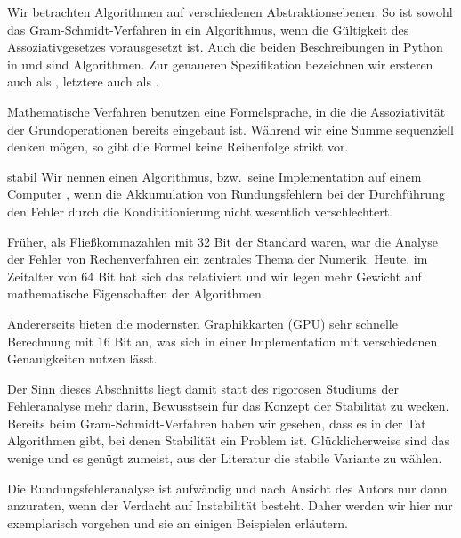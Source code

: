 \begin{remark}
  Wir betrachten Algorithmen auf verschiedenen Abstraktionsebenen. So
  ist sowohl das Gram-Schmidt-Verfahren in
   ein Algorithmus, wenn die
  Gültigkeit des Assoziativgesetzes vorausgesetzt ist. Auch die beiden
  Beschreibungen in Python in  und
   sind Algorithmen. Zur genaueren
  Spezifikation bezeichnen wir ersteren auch als
  , letztere auch als
  .
\end{remark}

\begin{remark}
  Mathematische Verfahren benutzen eine Formelsprache, in die die
  Assoziativität der Grundoperationen bereits eingebaut ist. Während
  wir eine Summe sequenziell denken mögen, so gibt die Formel keine
  Reihenfolge strikt vor.
\end{remark}

\begin{Definition}{stabil}
  Wir nennen einen Algorithmus, bzw.\ seine Implementation auf einem
  Computer , wenn die Akkumulation von Rundungsfehlern
  bei der Durchführung den Fehler durch die Kondititionierung nicht
  wesentlich verschlechtert.
\end{Definition}

\begin{remark}
  Früher, als Fließkommazahlen mit 32 Bit der Standard waren, war die
  Analyse der Fehler von Rechenverfahren ein zentrales Thema der
  Numerik. Heute, im Zeitalter von 64 Bit hat sich das relativiert und
  wir legen mehr Gewicht auf mathematische Eigenschaften der Algorithmen.

  Andererseits bieten die modernsten Graphikkarten (GPU) sehr schnelle
  Berechnung mit 16 Bit an, was sich in einer Implementation mit
  verschiedenen Genauigkeiten nutzen lässt.

  Der Sinn dieses Abschnitts liegt damit statt des rigorosen Studiums
  der Fehleranalyse mehr darin, Bewusstsein für das Konzept der
  Stabilität zu wecken. Bereits beim Gram-Schmidt-Verfahren haben wir
  gesehen, dass es in der Tat Algorithmen gibt, bei denen Stabilität
  ein Problem ist. Glücklicherweise sind das wenige und es genügt
  zumeist, aus der Literatur die stabile Variante zu wählen.

  Die Rundungsfehleranalyse ist aufwändig und nach Ansicht des Autors
  nur dann anzuraten, wenn der Verdacht auf Instabilität
  besteht. Daher werden wir hier nur exemplarisch vorgehen und sie an
  einigen Beispielen erläutern.
\end{remark}

